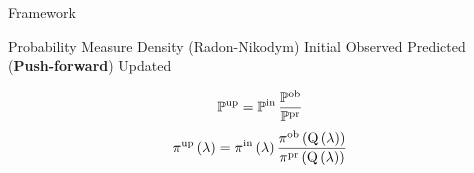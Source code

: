 \begin{block}{Framework}
\large
    \begin{itemize}
        \itembox{$ \PP$} Probability Measure
        \itembox{$ \pi $} Density (Radon-Nikodym)
        \itembox{$ \initialP, \; \initial $} Initial
        \itembox{$ \observedP, \; \observed $} Observed
        \itembox{$ \predictedP, \; \predicted $} Predicted (\textbf{Push-forward})
        \itembox{$ \updatedP, \; \updated $} Updated
    \end{itemize}

\Large
\centering
    \begin{equation*}
            \dciP 
    \end{equation*}
    \begin{equation*}
            \dci
    \end{equation*}

\end{block}
